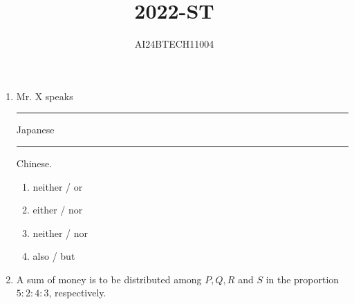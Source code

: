 \documentclass[journal]{IEEEtran}
\begin{document}

\onecolumn
\newpage
\title{2022-ST}
\author{AI24BTECH11004}
\maketitle

\begin{enumerate}
       \item Mr. X speaks \rule{1cm}{0.15mm} Japanese \rule{1cm}{0.15mm} Chinese.
       \begin{enumerate}
           \item neither / or
           \item either / nor
           \item neither / nor
           \item also / but
       \end{enumerate}

       \item A sum of money is to be distributed among $P, Q, R$ and $S$ in the proportion $5: 2 : 4 :3$, respectively.


\end{enumerate}
\end{document}
